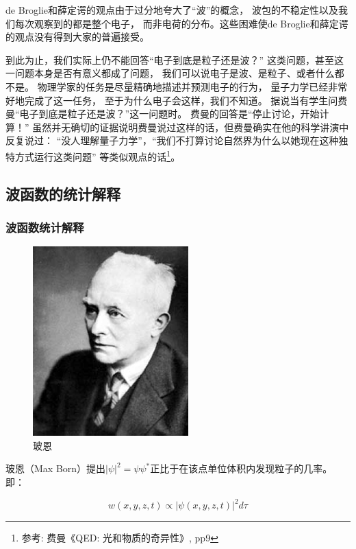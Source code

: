 de Broglie和薛定谔的观点由于过分地夸大了``波''的概念，
波包的不稳定性以及我们每次观察到的都是整个电子，
而非电荷的分布。这些困难使de Broglie和薛定谔的观点没有得到大家的普遍接受。

到此为止，我们实际上仍不能回答``电子到底是粒子还是波？''
这类问题，甚至这一问题本身是否有意义都成了问题，
我们可以说电子是波、是粒子、或者什么都不是。
物理学家的任务是尽量精确地描述并预测电子的行为，
量子力学已经非常好地完成了这一任务，
至于为什么电子会这样，我们不知道。
据说当有学生问费曼``电子到底是粒子还是波？''这一问题时。
费曼的回答是``停止讨论，开始计算！''
虽然并无确切的证据说明费曼说过这样的话，但费曼确实在他的科学讲演中反复说过：
``没人理解量子力学''，``我们不打算讨论自然界为什么以她现在这种独特方式运行这类问题''
等类似观点的话\footnote{参考: 费曼《QED: 光和物质的奇异性》, pp9}。



\subsection{波函数的统计解释}

\subsubsection{波函数统计解释}

\begin{figure}[h]
\begin{center}
\includegraphics[clip,width=6cm]{WaveFunction/born.ps}
\caption{玻恩}
\end{center}
\end{figure}

玻恩（Max Born）提出$\left| \psi  \right|^2  = \psi \psi ^* $正比于在该点单位体积内发现粒子的几率。即：

\begin{center}
\begin{equation}\label{max born}
    w(x,y,z,t) \propto \left| {\psi (x,y,z,t)} \right|^2 d\tau
\end{equation}
\end{center}



